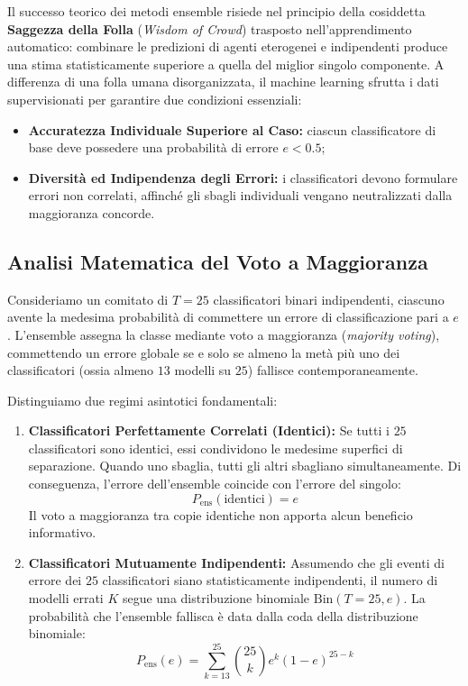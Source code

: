 Il successo teorico dei metodi ensemble risiede nel principio della cosiddetta \textbf{Saggezza della Folla} (\textit{Wisdom of Crowd}) trasposto nell'apprendimento automatico: combinare le predizioni di agenti eterogenei e indipendenti produce una stima statisticamente superiore a quella del miglior singolo componente. A differenza di una folla umana disorganizzata, il machine learning sfrutta i dati supervisionati per garantire due condizioni essenziali:
\begin{itemize}
    \item \textbf{Accuratezza Individuale Superiore al Caso:} ciascun classificatore di base deve possedere una probabilità di errore $e < 0.5$;
    \item \textbf{Diversità ed Indipendenza degli Errori:} i classificatori devono formulare errori non correlati, affinché gli sbagli individuali vengano neutralizzati dalla maggioranza concorde.
\end{itemize}

\FloatBarrier
\subsection{Analisi Matematica del Voto a Maggioranza}
\label{subsec:dm-majority-voting-math}

Consideriamo un comitato di $T = 25$ classificatori binari indipendenti, ciascuno avente la medesima probabilità di commettere un errore di classificazione pari a $e$. L'ensemble assegna la classe mediante voto a maggioranza (\textit{majority voting}), commettendo un errore globale se e solo se almeno la metà più uno dei classificatori (ossia almeno $13$ modelli su $25$) fallisce contemporaneamente.

Distinguiamo due regimi asintotici fondamentali:
\begin{enumerate}
    \item \textbf{Classificatori Perfettamente Correlati (Identici):} Se tutti i $25$ classificatori sono identici, essi condividono le medesime superfici di separazione. Quando uno sbaglia, tutti gli altri sbagliano simultaneamente. Di conseguenza, l'errore dell'ensemble coincide con l'errore del singolo:
    \begin{equation}
        P_{\text{ens}}(\text{identici}) = e
    \end{equation}
    Il voto a maggioranza tra copie identiche non apporta alcun beneficio informativo.

    \item \textbf{Classificatori Mutuamente Indipendenti:} Assumendo che gli eventi di errore dei $25$ classificatori siano statisticamente indipendenti, il numero di modelli errati $K$ segue una distribuzione binomiale $\text{Bin}(T=25, e)$. La probabilità che l'ensemble fallisca è data dalla coda della distribuzione binomiale:
    \begin{equation}
        P_{\text{ens}}(e) = \sum_{k=13}^{25} \binom{25}{k} e^k (1 - e)^{25 - k}
        \label{eq:dm-ensemble-binomial-error}
    \end{equation}
\end{enumerate}

